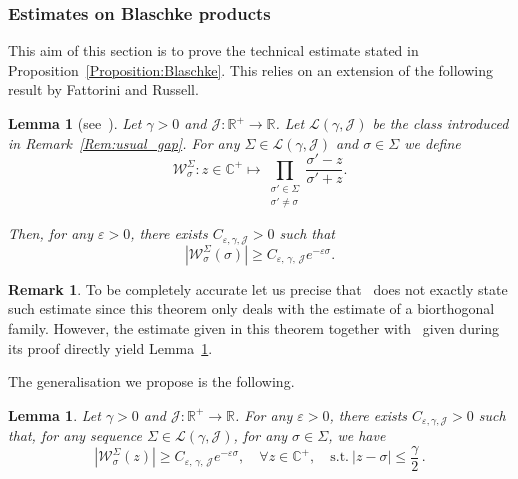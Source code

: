 \documentclass[10pt]{amsart}
\newtheorem{lemm}[theo]{Lemma}\newtheorem{prop}[theo]{Proposition}\newtheorem{coro}[theo]{Corollary}\newtheorem{conj}[theo]{Conjecture}
\theoremstyle{definition}\newtheorem{defi}[theo]{Definition}\newtheorem{rema}[theo]{Remark}\newtheorem{exam}[theo]{Example}\newtheorem{exem}[theo]{Example}\newtheorem{nota}[theo]{Notation}
\newcommand{\LL}{\mathcal{L}}
\newcommand{\R}{\mathbb{R}}
\newcommand{\C}{\mathbb{C}}
\let\oldforall\forall
\renewcommand*{\forall}{\mathrel{\oldforall}}
\begin{document}
\subsubsection{Estimates on Blaschke products} \label{Subsec:Blaschke}

This aim of this section is to prove the technical estimate stated in Proposition~\ref{Proposition:Blaschke}. This relies on an extension of the following result by Fattorini and Russell.
\begin{lemm}[{see~\cite[Theorem~1.1]{FattoriniRussell74}}] \label{Lem:FattoriniRussell74}
Let $\gamma >0$ and $\mathcal{J} : \R^+ \to \R$. Let $\LL(\gamma, \mathcal{J})$ be the class introduced in Remark~\ref{Rem:usual_gap}. For any $\Sigma \in \mathcal{L}(\gamma, \mathcal{J})$ and $\sigma \in \Sigma$ we define
\[
\mathcal{W}^\Sigma_{\sigma} : z \in \C^+ \mapsto \prod_{\substack{\sigma' \in \Sigma\\ \sigma' \neq \sigma}} \frac{\sigma'-z}{\sigma'+z}.
\]

Then, for any $\varepsilon>0$, there exists $C_{\varepsilon,\gamma, \mathcal{J}}>0$ such that
\[
\left| \mathcal{W}^{\Sigma}_{\sigma}(\sigma) \right| \geq C_{\varepsilon,\,\gamma,\, \mathcal{J}} e^{-\varepsilon \sigma}.
\]
\end{lemm}

\begin{rema}
To be completely accurate let us precise that~\cite[Theorem~1.1]{FattoriniRussell74} does not exactly state such estimate since this theorem only deals with the estimate of a biorthogonal family. However, the estimate given in this theorem together with~\cite[equality (2.1)]{FattoriniRussell74} given during its proof directly yield Lemma~\ref{Lem:FattoriniRussell74}.
\end{rema}


The generalisation we propose is the following.

\begin{lemm} \label{Lemme:ExtensionFattoriniRussell74}
Let $\gamma >0$ and $\mathcal{J} : \R^+ \to \R$. For any $\varepsilon>0$, there exists $C_{\varepsilon, \gamma, \mathcal{J}}>0$ such that, for any sequence $\Sigma \in \mathcal{L}(\gamma, \mathcal{J})$, for any $\sigma \in \Sigma$, we have
\[
\left| \mathcal{W}^{\Sigma}_{\sigma}(z) \right| \geq C_{\varepsilon,\,\gamma,\, \mathcal{J}} e^{-\varepsilon \sigma},\quad \forall z\in \C^+,\quad\text{s.t.} \ |z-\sigma| \leq \frac{\gamma}{2}\,.
\]
\end{lemm}
\end{document}

